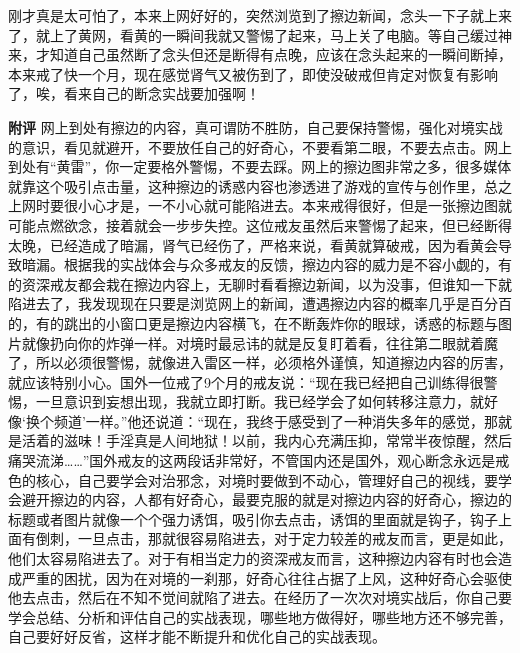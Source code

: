 \begin{case}
    刚才真是太可怕了，本来上网好好的，突然浏览到了擦边新闻，念头一下子就上来了，就上了黄网，看黄的一瞬间我就又警惕了起来，马上关了电脑。等自己缓过神来，才知道自己虽然断了念头但还是断得有点晚，应该在念头起来的一瞬间断掉，本来戒了快一个月，现在感觉肾气又被伤到了，即使没破戒但肯定对恢复有影响了，唉，看来自己的断念实战要加强啊！

    \textbf{附评} 网上到处有擦边的内容，真可谓防不胜防，自己要保持警惕，强化对境实战的意识，看见就避开，不要放任自己的好奇心，不要看第二眼，不要去点击。网上到处有“黄雷”，你一定要格外警惕，不要去踩。网上的擦边图非常之多，很多媒体就靠这个吸引点击量，这种擦边的诱惑内容也渗透进了游戏的宣传与创作里，总之上网时要很小心才是，一不小心就可能陷进去。本来戒得很好，但是一张擦边图就可能点燃欲念，接着就会一步步失控。这位戒友虽然后来警惕了起来，但已经断得太晚，已经造成了暗漏，肾气已经伤了，严格来说，看黄就算破戒，因为看黄会导致暗漏。根据我的实战体会与众多戒友的反馈，擦边内容的威力是不容小觑的，有的资深戒友都会栽在擦边内容上，无聊时看看擦边新闻，以为没事，但谁知一下就陷进去了，我发现现在只要是浏览网上的新闻，遭遇擦边内容的概率几乎是百分百的，有的跳出的小窗口更是擦边内容横飞，在不断轰炸你的眼球，诱惑的标题与图片就像扔向你的炸弹一样。对境时最忌讳的就是反复盯着看，往往第二眼就着魔了，所以必须很警惕，就像进入雷区一样，必须格外谨慎，知道擦边内容的厉害，就应该特别小心。国外一位戒了9个月的戒友说：“现在我已经把自己训练得很警惕，一旦意识到妄想出现，我就立即打断。我已经学会了如何转移注意力，就好像‘换个频道’一样。”他还说道：“现在，我终于感受到了一种消失多年的感觉，那就是活着的滋味！手淫真是人间地狱！以前，我内心充满压抑，常常半夜惊醒，然后痛哭流涕……”国外戒友的这两段话非常好，不管国内还是国外，观心断念永远是戒色的核心，自己要学会对治邪念，对境时要做到不动心，管理好自己的视线，要学会避开擦边的内容，人都有好奇心，最要克服的就是对擦边内容的好奇心，擦边的标题或者图片就像一个个强力诱饵，吸引你去点击，诱饵的里面就是钩子，钩子上面有倒刺，一旦点击，那就很容易陷进去，对于定力较差的戒友而言，更是如此，他们太容易陷进去了。对于有相当定力的资深戒友而言，这种擦边内容有时也会造成严重的困扰，因为在对境的一刹那，好奇心往往占据了上风，这种好奇心会驱使他去点击，然后在不知不觉间就陷了进去。在经历了一次次对境实战后，你自己要学会总结、分析和评估自己的实战表现，哪些地方做得好，哪些地方还不够完善，自己要好好反省，这样才能不断提升和优化自己的实战表现。
\end{case}

